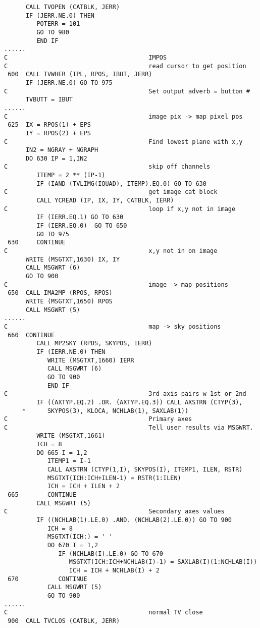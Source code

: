 \begin{verbatim}
      CALL TVOPEN (CATBLK, JERR)
      IF (JERR.NE.0) THEN
         POTERR = 101
         GO TO 980
         END IF
......
C                                       IMPOS
C                                       read cursor to get position
 600  CALL TVWHER (IPL, RPOS, IBUT, JERR)
      IF (JERR.NE.0) GO TO 975
C                                       Set output adverb = button #
      TVBUTT = IBUT
......
C                                       image pix -> map pixel pos
 625  IX = RPOS(1) + EPS
      IY = RPOS(2) + EPS
C                                       Find lowest plane with x,y
      IN2 = NGRAY + NGRAPH
      DO 630 IP = 1,IN2
C                                       skip off channels
         ITEMP = 2 ** (IP-1)
         IF (IAND (TVLIMG(IQUAD), ITEMP).EQ.0) GO TO 630
C                                       get image cat block
         CALL YCREAD (IP, IX, IY, CATBLK, IERR)
C                                       loop if x,y not in image
         IF (IERR.EQ.1) GO TO 630
         IF (IERR.EQ.0)  GO TO 650
         GO TO 975
 630     CONTINUE
C                                       x,y not in on image
      WRITE (MSGTXT,1630) IX, IY
      CALL MSGWRT (6)
      GO TO 900
C                                       image -> map positions
 650  CALL IMA2MP (RPOS, RPOS)
      WRITE (MSGTXT,1650) RPOS
      CALL MSGWRT (5)
......
C                                       map -> sky positions
 660  CONTINUE
         CALL MP2SKY (RPOS, SKYPOS, IERR)
         IF (IERR.NE.0) THEN
            WRITE (MSGTXT,1660) IERR
            CALL MSGWRT (6)
            GO TO 900
            END IF
C                                       3rd axis pairs w 1st or 2nd
         IF ((AXTYP.EQ.2) .OR. (AXTYP.EQ.3)) CALL AXSTRN (CTYP(3),
     *      SKYPOS(3), KLOCA, NCHLAB(1), SAXLAB(1))
C                                       Primary axes
C                                       Tell user results via MSGWRT.
         WRITE (MSGTXT,1661)
         ICH = 8
         DO 665 I = 1,2
            ITEMP1 = I-1
            CALL AXSTRN (CTYP(1,I), SKYPOS(I), ITEMP1, ILEN, RSTR)
            MSGTXT(ICH:ICH+ILEN-1) = RSTR(1:ILEN)
            ICH = ICH + ILEN + 2
 665        CONTINUE
         CALL MSGWRT (5)
C                                       Secondary axes values
         IF ((NCHLAB(1).LE.0) .AND. (NCHLAB(2).LE.0)) GO TO 900
            ICH = 8
            MSGTXT(ICH:) = ' '
            DO 670 I = 1,2
               IF (NCHLAB(I).LE.0) GO TO 670
                  MSGTXT(ICH:ICH+NCHLAB(I)-1) = SAXLAB(I)(1:NCHLAB(I))
                  ICH = ICH + NCHLAB(I) + 2
 670           CONTINUE
            CALL MSGWRT (5)
            GO TO 900
......
C                                       normal TV close
 900  CALL TVCLOS (CATBLK, JERR)

\end{verbatim}

